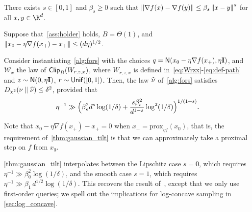 \begin{assumption}\label{ass:holder}
    There exists $s \in [0,1]$ and $\beta_s \ge 0$ such that $\norm{\nabla f(x) -\nabla f(y)} \le \beta_s\norm{x-y}^s$ for all $x,y\in\R^d$.
\end{assumption}

\begin{theorem}\label{thm:gaussian_tilt}
    Suppose that~\cref{ass:holder} holds, $B=\Theta(1)$, and $\nrm{\xz-\eta\nabla f(x_+) - x_+} \leq (d\eta)^{1/2}$.
    
    Consider instantiating~\cref{alg:fors} with the choices $q = \normal{\xz-\eta \nabla f(\xp),\eta\Id}$, and $\mathcal W_x$ the law of $\pclip{W_{r,z,x}}$, where $W_{r,z,x}$ is defined in~\eqref{eq:Wrzx}-\eqref{eq:def-path} and $z\sim \normal{0,\eta\Id}$, $r\sim \unif([0,1])$. 
    Then, the law $\wh\nu$ of~\cref{alg:fors} satisfies $\Dchis{\nu}{\wh\nu} \le \delta^2$, provided that
    \begin{align*}
        \eta^{-1} \gg \prn[\Big]{ \beta_s^2d^s\log(1/\delta)+\frac{s\beta_s^2}{d^{1-s}}\log^2(1/\delta) }^{1/(1+s)}.
    \end{align*}
\end{theorem}

Note that $x_0 - \eta\nabla f(x_+) - x_+ = 0$ when $x_+ = \text{prox}_{\eta f}(x_0)$, that is, the requirement of~\cref{thm:gaussian_tilt} is that we can approximately take a proximal step on $f$ from $x_0$.

\cref{thm:gaussian_tilt} interpolates between the Lipschitz case $s=0$, which requires $\eta^{-1} \gg \beta_0^2 \log(1/\delta)$, and the smooth case $s=1$, which requires $\eta^{-1} \gg \beta_1\, d^{1/2} \log(1/\delta)$.
This recovers the result of~\citet{FanYuaChe23ImprovedProx}, except that we only use first-order queries; we spell out the implications for log-concave sampling in \cref{sec:log_concave}.
